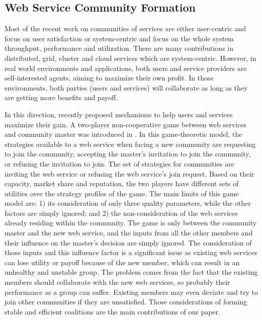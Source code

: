 \subsection{Web Service Community Formation}\label{sec:communities_for_rel}

Most of the recent work on communities of services are either
user-centric and focus on user satisfaction
\cite{Chun02user-centricperformance} or system-centric and focus
on the whole system throughput, performance and utilization. There
are many contributions in distributed, grid, cluster and cloud
services which are system-centric. However, in real world
environments and applications, both users and service providers
are self-interested agents, aiming to maximize their own profit.
In those environments, both parties (users and services) will
collaborate as long as they are getting more benefits and payoff.

In this direction, recently \cite{DBLP:conf/IEEEscc/LimTMB12,
DBLP:conf/IEEEscc/KhosravifarABT11, 10.1109/TSC.2012.12} proposed
mechanisms to help users and services maximize their gain. A
two-player non-cooperative game between web services and community
master was introduced in
\cite{DBLP:conf/IEEEscc/KhosravifarABT11}. In this game-theoretic
model, the strategies available to a web service when facing a new
community are requesting to join the community, accepting the
master's invitation to join the community, or refusing the
invitation to join. The set of strategies for communities are
inviting the web service or refusing the web service's join
request. Based on their capacity, market share and reputation, the
two players have different sets of utilities over the strategy
profiles of the game. The main limits of this game model are: 1)
its consideration of only three quality parameters, while the
other factors are simply ignored; and 2) the non-consideration of
the web services already residing within the community. The game
is only between the community master and the new web service, and
the inputs from all the other members and their influence on the
master's decision are simply ignored. The consideration of those
inputs and this influence factor is a significant issue as
existing web services can lose utility or payoff because of the
new member, which can result in an unhealthy and unstable group.
The problem comes from the fact that the existing members should
collaborate with the new web services, so probably their
performance as a group can suffer. Existing members may even
deviate and try to join other communities if they are unsatisfied.
Those considerations of forming stable and efficient coalitions
are the main contributions of our paper.

